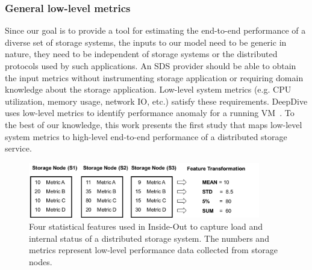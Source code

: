\subsubsection*{General low-level metrics}
%
Since our goal is to provide a tool for estimating the end-to-end performance of a diverse set of 
storage systems, the inputs to our model need to be generic in nature, \ie they need to 
be independent of storage systems or the distributed protocols used by such applications. An SDS provider 
should be able to obtain the input metrics without instrumenting storage application or requiring domain 
knowledge about the storage application. Low-level system metrics (e.g. CPU utilization, memory usage, network IO, etc.) 
satisfy these requirements. DeepDive uses low-level metrics to identify performance anomaly for a running VM~\cite{Novakovic2013}. 
To the best of our knowledge, this work presents the first study that maps low-level system metrics to 
high-level end-to-end performance of a distributed storage service.


\begin{figure}
\centering
\includegraphics[width=0.9\textwidth, keepaspectratio]{figures/features.pdf}
\caption{Four statistical features used in Inside-Out to capture load and internal status of a distributed storage system.  The numbers and metrics represent low-level performance data collected from storage nodes.}
\label{fig:feature_types}
\end{figure}


